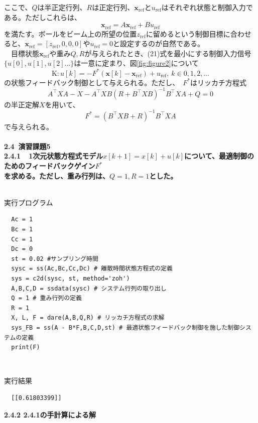 \documentclass[a4paper,10.5pt]{ltjsarticle}
\begin{document}
ここで、$Q$は半正定行列、$R$は正定行列、$\bm x_\mathrm{ref}$と$u_\mathrm{ref}$はそれぞれ状態と制御入力である。ただしこれらは、
\begin{equation}
  \bm x_\mathrm{ref}=A\bm x_\mathrm{ref}+Bu_\mathrm{ref}
\end{equation}
を満たす。ボールをビーム上の所望の位置$z_\mathrm{ref}$に留めるという制御目標に合わせると、$\bm x_\mathrm{ref}=[z_\mathrm{ref},0,0,0]$や$u_\mathrm{ref}=0$と設定するのが自然である。\\
　目標状態$\bm x_\mathrm{ref}$や重み$Q,R$が与えられたとき、(21)式を最小にする制御入力信号$\{u[0],u[1],u[2]\dots\}$は一意に定まり、図\ref{fig:figure2}について
\begin{equation}
  \mathrm{K}: u[k]=-F^*(\bm x[k]-\bm x_\mathrm{ref})+u_\mathrm{ref},\ k\in {0,1,2,\dots}
\end{equation}
の状態フィードバック制御として与えられる。ただし、　$F^*$はリッカチ方程式
\begin{equation}
  A^\top XA-X-A^\top XB(R+B^\top XB)^{-1}B^\top XA+Q=0
\end{equation}
の半正定解$X$を用いて、
\begin{equation}
  F^*=(B^\top XB+R)^{-1}B^\top XA
\end{equation}
で与えられる。\\
\\
{\large \bfseries 2.4 演習課題5}\\
{\large \bfseries 2.4.1 \ 1次元状態方程式モデル$x[k+1]=x[k]+u[k]$について、最適制御のためのフィードバックゲイン$F^*$\\
を求める。ただし、重み行列は、$Q=1,R=1$とした。}\\
\\
\centerline{実行プログラム}
\begin{lstlisting}
  Ac = 1
  Bc = 1
  Cc = 1
  Dc = 0
  st = 0.02 #サンプリング時間
  sysc = ss(Ac,Bc,Cc,Dc) # 離散時間状態方程式の定義
  sys = c2d(sysc, st, method='zoh')
  A,B,C,D = ssdata(sysc) # システム行列の取り出し
  Q = 1 # 重み行列の定義
  R = 1
  X, L, F = dare(A,B,Q,R) # リッカチ方程式の求解
  sys_FB = ss(A - B*F,B,C,D,st) # 最適状態フィードバック制御を施した制御システムの定義
  print(F)
\end{lstlisting}
\centerline{\ }
\centerline{実行結果}
\begin{lstlisting}
  [[0.61803399]]
\end{lstlisting}
\clearpage
{\large \bfseries 2.4.2 2.4.1の手計算による解}\\
\end{document}
